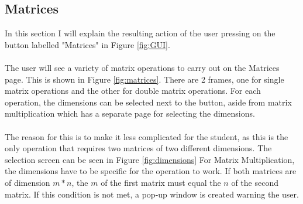 \documentclass[final]{cmpreport}
\begin{document}
	\subsection{Matrices} \label{sec:matrices}
	
	In this section I will explain the resulting action of the user pressing on the button labelled "Matrices" in Figure \ref{fig:GUI}.\\
	\\The user will see a variety of matrix operations to carry out on the Matrices page. This is shown in Figure \ref{fig:matrices}. There are 2 frames, one for single matrix operations and the other for double matrix operations. For each operation, the dimensions can be selected next to the button, aside from matrix multiplication which has a separate page for selecting the dimensions. \\
	\\The reason for this is to make it less complicated for the student, as this is the only operation that requires two matrices of two different dimensions. The selection screen can be seen in Figure \ref{fig:dimensions} For Matrix Multiplication, the dimensions have to be specific for the operation to work. If both matrices are of dimension $m * n$, the $m$ of the first matrix must equal the $n$ of the second matrix. If this condition is not met, a pop-up window is created warning the user.
	
\end{document}
